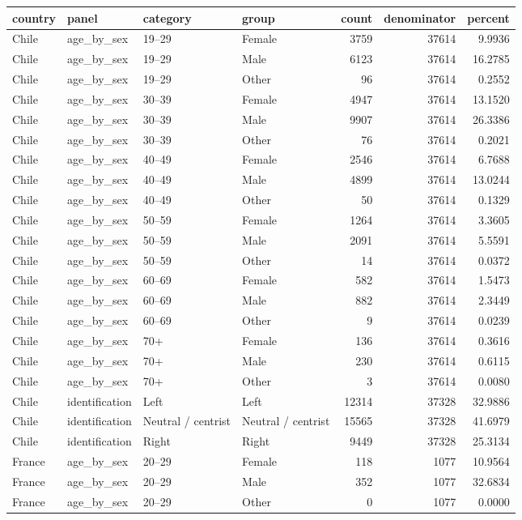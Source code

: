 \begin{tabular}{llllrrr}
\toprule
country & panel & category & group & count & denominator & percent \\
\midrule
Chile & age_by_sex & 19–29 & Female & 3759 & 37614 & 9.9936 \\
Chile & age_by_sex & 19–29 & Male & 6123 & 37614 & 16.2785 \\
Chile & age_by_sex & 19–29 & Other & 96 & 37614 & 0.2552 \\
Chile & age_by_sex & 30–39 & Female & 4947 & 37614 & 13.1520 \\
Chile & age_by_sex & 30–39 & Male & 9907 & 37614 & 26.3386 \\
Chile & age_by_sex & 30–39 & Other & 76 & 37614 & 0.2021 \\
Chile & age_by_sex & 40–49 & Female & 2546 & 37614 & 6.7688 \\
Chile & age_by_sex & 40–49 & Male & 4899 & 37614 & 13.0244 \\
Chile & age_by_sex & 40–49 & Other & 50 & 37614 & 0.1329 \\
Chile & age_by_sex & 50–59 & Female & 1264 & 37614 & 3.3605 \\
Chile & age_by_sex & 50–59 & Male & 2091 & 37614 & 5.5591 \\
Chile & age_by_sex & 50–59 & Other & 14 & 37614 & 0.0372 \\
Chile & age_by_sex & 60–69 & Female & 582 & 37614 & 1.5473 \\
Chile & age_by_sex & 60–69 & Male & 882 & 37614 & 2.3449 \\
Chile & age_by_sex & 60–69 & Other & 9 & 37614 & 0.0239 \\
Chile & age_by_sex & 70+ & Female & 136 & 37614 & 0.3616 \\
Chile & age_by_sex & 70+ & Male & 230 & 37614 & 0.6115 \\
Chile & age_by_sex & 70+ & Other & 3 & 37614 & 0.0080 \\
Chile & identification & Left & Left & 12314 & 37328 & 32.9886 \\
Chile & identification & Neutral / centrist & Neutral / centrist & 15565 & 37328 & 41.6979 \\
Chile & identification & Right & Right & 9449 & 37328 & 25.3134 \\
France & age_by_sex & 20–29 & Female & 118 & 1077 & 10.9564 \\
France & age_by_sex & 20–29 & Male & 352 & 1077 & 32.6834 \\
France & age_by_sex & 20–29 & Other & 0 & 1077 & 0.0000 \\

\end{tabular}
